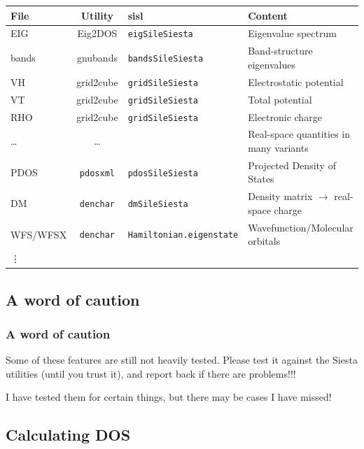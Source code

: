 \begin{frame}
  \begin{tabular}{lcll}
    File & Utility & sisl & Content
    \\
    \hline
    EIG & Eig2DOS & \texttt{eigSileSiesta} & Eigenvalue spectrum
    \\
    bands & gnubands & \texttt{bandsSileSiesta} & Band-structure eigenvalues
    \\
    VH & grid2cube & \texttt{gridSileSiesta} & Electrostatic potential
    \\
    VT & grid2cube & \texttt{gridSileSiesta} & Total potential
    \\
    RHO & grid2cube & \texttt{gridSileSiesta} & Electronic charge
    \\
    \dots & \dots & & Real-space quantities in many variants
    \\
    PDOS & \texttt{pdosxml} & \texttt{pdosSileSiesta} & Projected Density of States
    \\
    DM & \texttt{denchar} & \texttt{dmSileSiesta} & Density matrix $\to$ real-space charge
    \\
    WFS/WFSX & \texttt{denchar} & \texttt{Hamiltonian.eigenstate} & Wavefunction/Molecular
    orbitals
    \\
    \vdots
  \end{tabular}

\end{frame}

\subsection{A word of caution}

\begin{frame}
  \frametitle{A word of caution}

  Some of these features are still not heavily tested. Please
  test it against the Siesta utilities (until you trust it), and report back if there are problems!!!

  \vspace{1cm}
  I have tested them for certain things, but there may be cases I have missed!

\end{frame}

\subsection{Calculating DOS}

